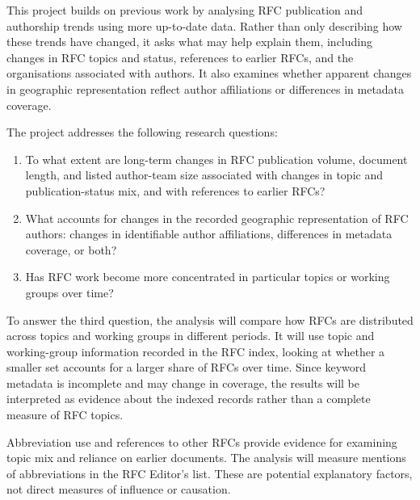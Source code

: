 \documentclass{l4proj}
\begin{document}
This project builds on previous work by analysing RFC publication and authorship trends using more up-to-date data. Rather than only describing how these trends have changed, it asks what may help explain them, including changes in RFC topics and status, references to earlier RFCs, and the organisations associated with authors. It also examines whether apparent changes in geographic representation reflect author affiliations or differences in metadata coverage.

The project addresses the following research questions:

\begin{enumerate}
    \item To what extent are long-term changes in RFC publication volume, document length, and listed author-team size associated with changes in topic and publication-status mix, and with references to earlier RFCs?
    \item What accounts for changes in the recorded geographic representation of RFC authors: changes in identifiable author affiliations, differences in metadata coverage, or both?
    \item \begin{highlight}
    Has RFC work become more concentrated in particular topics or working groups over time?
    \end{highlight}
\end{enumerate}

\begin{highlight}
To answer the third question, the analysis will compare how RFCs are distributed across topics and working groups in different periods. It will use topic and working-group information recorded in the RFC index, looking at whether a smaller set accounts for a larger share of RFCs over time. Since keyword metadata is incomplete and may change in coverage, the results will be interpreted as evidence about the indexed records rather than a complete measure of RFC topics.
\end{highlight}

Abbreviation use and references to other RFCs provide evidence for examining topic mix and reliance on earlier documents. The analysis will measure mentions of abbreviations in the RFC Editor's list. These are potential explanatory factors, not direct measures of influence or causation.

\end{document}
